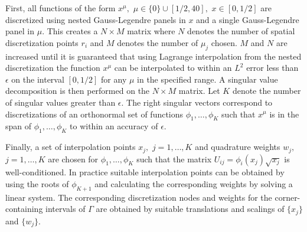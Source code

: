 First, all functions of the form $x^\mu,$ $\mu \in \{0\} \cup [1/2,40],$ $x \in [0,1/2]$ are discretized using nested Gauss-Legendre panels in $x$ and a single Gauss-Legendre panel in $\mu$. This creates a $N \times M$ matrix where $N$ denotes the number of spatial discretization points $r_i$ and $M$ denotes the number of $\mu_j$ chosen. $M$ and $N$ are increased until it is guaranteed that using Lagrange interpolation from the nested discretization the function $x^\mu$ can be interpolated to within an $L^2$ error less than $\epsilon$ on the interval $[0,1/2]$ for any $\mu$ in the specified range. A singular value decomposition is then performed on the $N\times M$ matrix. Let $K$ denote the number of singular values greater than $\epsilon.$ The right singular vectors correspond to discretizations of an orthonormal set of functions $\phi_1,\dots,\phi_K$ such that $x^\mu$ is in the span of $\phi_1,\dots,\phi_K$ to within an accuracy of $\epsilon.$

Finally, a set of interpolation points $x_j,$ $j=1,\dots,K$ and quadrature weights $w_j,$ $j=1,\dots,K$ are chosen for $\phi_1,\dots,\phi_K$ such that the matrix $U_{ij} = \phi_i(x_j) \sqrt{x_j}$ is well-conditioned. In practice suitable interpolation points can be obtained by using the roots of $\phi_{K+1}$ and calculating the corresponding weights by solving a linear system. The corresponding discretization nodes and weights for the corner-containing intervals of $\Gamma$ are obtained by suitable translations and scalings of $\{x_j\}$ and $\{w_j\}.$

